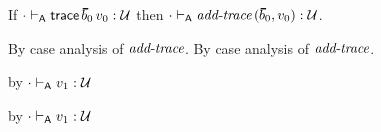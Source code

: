 \begin{lemma}\label{A-addtrace-type-preservation}
  If\/ $\snil \sWTA \eprehist{\sblist_0}{\svalue_0} : \tdyn$
  then\/ $\snil \sWTA \faddtrace{\sblist_0}{\svalue_0} : \tdyn$.
\end{lemma}{
  \newcommand{\shortpf}{By case analysis of $\saddtrace$.}
\begin{lamportproof*}
  \shortpf
\mainproof
  \shortpf

    \begin{pfproof}
      \qedstep
    \end{pfproof}

    \begin{pfproof}
      \qedstep
        \begin{pfproof}
          by ${\cdot} \vdash_{\mathsf{A}} v_1 : {\mathcal U}$
        \end{pfproof}
    \end{pfproof}

    \begin{pfproof}
      \qedstep
        \begin{pfproof}
          by ${\cdot} \vdash_{\mathsf{A}} v_1 : {\mathcal U}$
        \end{pfproof}
    \end{pfproof}

\end{lamportproof*}}

